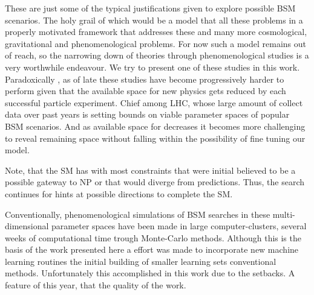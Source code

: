 These are just some of the typical justifications given to explore possible BSM scenarios. The holy grail of which would be a model that  all  these problems in a properly motivated framework that addresses these and many more cosmological, gravitational  and phenomenological problems.  
% 
For now\Joaoadd{,} such a model remains out of reach, so the narrowing down of theories through phenomenological studies is a very worthwhile endeavour. We try to present one of these studies in this work. %
%
Paradoxically , as of late\Joaoadd{,} these studies have become progressively harder to perform given that the available space for new physics  gets reduced by each successful particle experiment. 
%
Chief among    LHC, whose large amount of collect data over past years is setting  bounds on viable parameter spaces of popular BSM scenarios. 
%
And as  available space for  decreases\Joaoadd{,} it becomes more challenging to reveal  remaining space without falling within the possibility of fine tuning our model.  


Note, that the SM has   with most constraints that were initial believed to be a possible gateway to  NP or that would diverge from  predictions. Thus, the search continues for hints at possible directions to complete the SM. %

Conventionally, phenomenological simulations of BSM searches in these multi-dimensional parameter spaces have been made in large computer-clusters,  several weeks of computational time trough  Monte-Carlo methods. 
%
Although this is the basis of the work presented here\Joaoadd{,} a effort was made to incorporate new machine learning routines  the initial building of smaller learning sets  conventional methods. 
%
Unfortunately this  accomplished in this work due to the  setbacks. A feature of this year, that  the quality of the work. 

